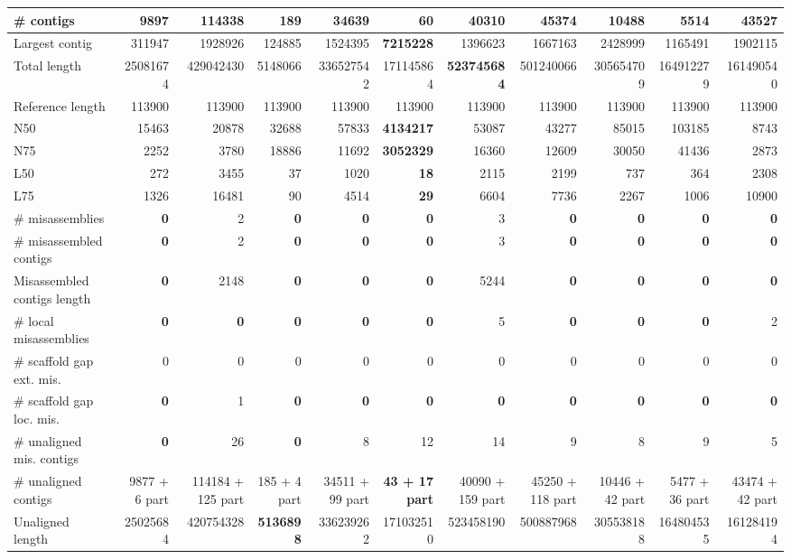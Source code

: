 \documentclass[12pt,a4paper]{article}
\begin{document}
\begin{table}[ht]
\begin{center}
\begin{tabular}{|l*{10}{|r}|}
\# contigs & 9897 & 114338 & 189 & 34639 & 60 & 40310 & 45374 & 10488 & 5514 & 43527 \\ \hline
Largest contig & 311947 & 1928926 & 124885 & 1524395 & {\bf 7215228} & 1396623 & 1667163 & 2428999 & 1165491 & 1902115 \\ \hline
Total length & 25081674 & 429042430 & 5148066 & 336527542 & 171145864 & {\bf 523745684} & 501240066 & 305654709 & 164912279 & 161490540 \\ \hline
Reference length & 113900 & 113900 & 113900 & 113900 & 113900 & 113900 & 113900 & 113900 & 113900 & 113900 \\ \hline
N50 & 15463 & 20878 & 32688 & 57833 & {\bf 4134217} & 53087 & 43277 & 85015 & 103185 & 8743 \\ \hline
N75 & 2252 & 3780 & 18886 & 11692 & {\bf 3052329} & 16360 & 12609 & 30050 & 41436 & 2873 \\ \hline
L50 & 272 & 3455 & 37 & 1020 & {\bf 18} & 2115 & 2199 & 737 & 364 & 2308 \\ \hline
L75 & 1326 & 16481 & 90 & 4514 & {\bf 29} & 6604 & 7736 & 2267 & 1006 & 10900 \\ \hline
\# misassemblies & {\bf 0} & 2 & {\bf 0} & {\bf 0} & {\bf 0} & 3 & {\bf 0} & {\bf 0} & {\bf 0} & {\bf 0} \\ \hline
\# misassembled contigs & {\bf 0} & 2 & {\bf 0} & {\bf 0} & {\bf 0} & 3 & {\bf 0} & {\bf 0} & {\bf 0} & {\bf 0} \\ \hline
Misassembled contigs length & {\bf 0} & 2148 & {\bf 0} & {\bf 0} & {\bf 0} & 5244 & {\bf 0} & {\bf 0} & {\bf 0} & {\bf 0} \\ \hline
\# local misassemblies & {\bf 0} & {\bf 0} & {\bf 0} & {\bf 0} & {\bf 0} & 5 & {\bf 0} & {\bf 0} & {\bf 0} & 2 \\ \hline
\# scaffold gap ext. mis. & 0 & 0 & 0 & 0 & 0 & 0 & 0 & 0 & 0 & 0 \\ \hline
\# scaffold gap loc. mis. & {\bf 0} & 1 & {\bf 0} & {\bf 0} & {\bf 0} & {\bf 0} & {\bf 0} & {\bf 0} & {\bf 0} & {\bf 0} \\ \hline
\# unaligned mis. contigs & {\bf 0} & 26 & {\bf 0} & 8 & 12 & 14 & 9 & 8 & 9 & 5 \\ \hline
\# unaligned contigs & 9877 + 6 part & 114184 + 125 part & 185 + 4 part & 34511 + 99 part & {\bf 43 + 17 part} & 40090 + 159 part & 45250 + 118 part & 10446 + 42 part & 5477 + 36 part & 43474 + 42 part \\ \hline
Unaligned length & 25025684 & 420754328 & {\bf 5136898} & 336239262 & 171032510 & 523458190 & 500887968 & 305538188 & 164804535 & 161284194 \\ \hline

\end{tabular}
\end{center}
\end{table}
\end{document}
